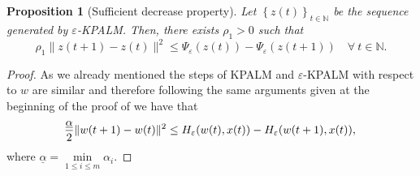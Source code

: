 \documentclass[11pt]{article}
\numberwithin{equation}{section}
\newtheorem{proposition}{Proposition}[section]
\begin{document}
\begin{proposition}[Sufficient decrease property]
Let $\left\lbrace z(t) \right\rbrace_{t \in \mathbb{N}}$ be the sequence generated by $\varepsilon$-KPALM. Then, there exists $\rho_1 > 0$ such that 
\begin{equation*}
	\rho_1 \|z(t+1) - z(t)\|^2 \leq \Psi_{\varepsilon}(z(t)) - \Psi_{\varepsilon}(z(t+1)) \quad \forall \: t \in \mathbb{N} .
\end{equation*}
\end{proposition}

\begin{proof}
As we already mentioned the steps of KPALM and $\varepsilon$-KPALM with respect to $w$ are similar and therefore following the same arguments given at the beginning of the proof of  we have that
\begin{equation}
	\frac{\underline{\alpha}}{2} \|w(t+1) - w(t)\|^2 \leq H_{\varepsilon}(w(t),x(t)) - H_{\varepsilon}(w(t+1),x(t)) , \\ \label{StateEq37}
\end{equation}
where $\underline{\alpha} = \min\limits_{1 \leq i \leq m} \alpha_i $.


\end{proof}
\end{document}
